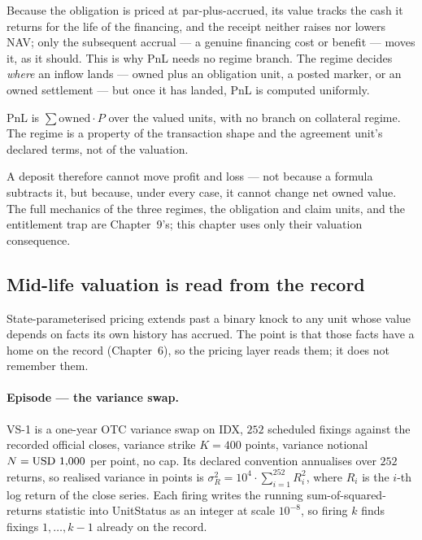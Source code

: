 Because the obligation is priced at par-plus-accrued, its value tracks the cash
it returns for the life of the financing, and the receipt neither raises nor
lowers NAV; only the subsequent accrual --- a genuine financing cost or
benefit --- moves it, as it should. This is why PnL needs no regime branch. The
regime decides \emph{where} an inflow lands --- owned plus an obligation unit,
a posted marker, or an owned settlement --- but once it has landed, PnL is
computed uniformly.

\begin{principle}
PnL is $\sum \mathrm{owned}\cdot P$ over the valued units, with no branch on
collateral regime. The regime is a property of the transaction shape and the
agreement unit's declared terms, not of the valuation.
\end{principle}

A deposit therefore cannot move profit and loss --- not because a formula
subtracts it, but because, under every case, it cannot change net owned value.
The full mechanics of the three regimes, the obligation and claim units, and
the entitlement trap are Chapter~9's; this chapter uses only their valuation
consequence.

\subsection{Mid-life valuation is read from the record}

State-parameterised pricing extends past a binary knock to any unit whose value
depends on facts its own history has accrued. The point is that those facts
have a home on the record (Chapter~6), so the pricing layer reads them; it does
not remember them.

\paragraph{Episode --- the variance swap.}
VS-1 is a one-year OTC variance swap on IDX, $252$ scheduled fixings against
the recorded official closes, variance strike $K = 400$ points, variance
notional $N = \mbox{USD~1,000}$ per point, no cap. Its declared convention
annualises over $252$ returns, so realised variance in points is
$\sigma^2_R = 10^4 \cdot \sum_{i=1}^{252} R_i^2$, where $R_i$ is the $i$-th log
return of the close series. Each firing writes the running
sum-of-squared-returns statistic into UnitStatus as an integer at scale
$10^{-8}$, so firing $k$ finds fixings $1,\dots,k-1$ already on the record.

